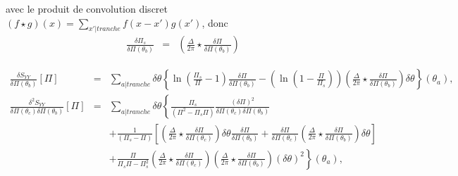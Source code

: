 	avec le produit de convolution discret $( f \star g )(x) = \sum_{x'\vert tranche } f( x - x') g(x') $, donc 
	\begin{eqnarray}
			\frac{\delta \Pi_s }{\delta \Pi( \theta_b)}   & = &\left  ( \frac{\Delta}{2\pi} \star \frac{\delta \Pi}{\delta \Pi(\theta_b) }  \right )	
		\end{eqnarray}
	
	\begin{eqnarray}
			\frac{ \delta S_{YY} }{ \delta \Pi(\theta_b)} [\Pi ]  & = & \sum_{a\vert tranche}   \delta \theta \left \{ \ln \left ( \frac{ \Pi_s }{ \Pi} - 1 \right )\frac{\delta \Pi }{ \delta \Pi (\theta_b) } -  \left ( \ln \left ( 1 - \frac{ \Pi}{ \Pi_s}\right ) \right ) \left ( \frac{ \Delta}{2 \pi} \star \frac{\delta \Pi }{ \delta \Pi(\theta_b) }  \right)  \delta \theta \right \} ( \theta_	a ),\\
			\frac{ \delta^2 S_{YY} }{ \delta \Pi(\theta_c) \delta \Pi(\theta_b)  } [\Pi ]  & = & \sum_{a \vert tranche}   \delta \theta \left \{  \frac{\Pi_s}{(\Pi^2  - \Pi_s\Pi)} \frac{(\delta \Pi)^2}{ \delta \Pi(\theta_c) \delta \Pi(\theta_b)  } \right . \\
		&  &  +  \left . \frac{1 }{(\Pi_s -\Pi) } \left [ \left (  \frac{\Delta}{2\pi} \star\frac{\delta \Pi}{\delta \Pi(\theta_c)}   \right )   \delta \theta \frac{\delta \Pi}{\delta \Pi(\theta_b)}+ \frac{\delta \Pi}{\delta \Pi(\theta_c)} \left (  \frac{\Delta}{2\pi} \star\frac{\delta \Pi}{\delta \Pi(\theta_b)} \right )  \delta \theta  \right ] \right . \\
		& & + \left .  \frac{\Pi }{\Pi_s\Pi - \Pi_s^2 }\left (  \frac{\Delta}{2\pi} \star\frac{\delta \Pi}{\delta \Pi(\theta_c)} \right )\left (  \frac{\Delta}{2\pi} \star\frac{\delta \Pi}{\delta \Pi(\theta_b)} \right )   (\delta \theta)^2 \right \}(\theta_a),	
	\end{eqnarray}
	
%	
		
